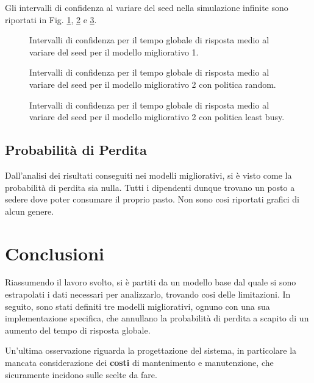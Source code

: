 \documentclass{article}
\begin{document}
Gli intervalli di confidenza al variare del seed nella simulazione infinite sono riportati in Fig. \ref{fig:grt_seed_infinite_200}, \ref{fig:ext_grt_seed_infinite_m21} e \ref{fig:ext_grt_seed_infinite_m22}.

\begin{figure}[H]
  \centering
  
  \caption{Intervalli di confidenza per il tempo globale di risposta medio al variare del seed per il modello migliorativo 1.}
  \label{fig:grt_seed_infinite_200}
\end{figure}

\begin{figure}[H]
  \centering
  
  \caption{Intervalli di confidenza per il tempo globale di risposta medio al variare del seed per il modello migliorativo 2 con politica random.}
  \label{fig:ext_grt_seed_infinite_m21}
\end{figure}

\begin{figure}[H]
  \centering
  
  \caption{Intervalli di confidenza per il tempo globale di risposta medio al variare del seed per il modello migliorativo 2 con politica least busy.}
  \label{fig:ext_grt_seed_infinite_m22}
\end{figure}

\subsection{Probabilità di Perdita}

Dall'analisi dei risultati conseguiti nei modelli migliorativi, si è visto come la probabilità di perdita sia nulla. Tutti i dipendenti dunque trovano un posto a sedere dove poter consumare il proprio pasto.  
Non sono cosi riportati grafici di alcun genere.

\section{Conclusioni}

Riassumendo il lavoro svolto, si è partiti da un modello base dal quale si sono estrapolati i dati necessari per analizzarlo, trovando cosi delle limitazioni. In seguito, sono stati definiti tre modelli migliorativi, ognuno con una sua implementazione specifica, che annullano la probabilità di perdita a scapito di un aumento del tempo di risposta globale.

Un'ultima osservazione riguarda la progettazione del sistema, in particolare la mancata considerazione dei \textbf{costi} di mantenimento e manutenzione, che sicuramente incidono sulle scelte da fare. 
\end{document}
